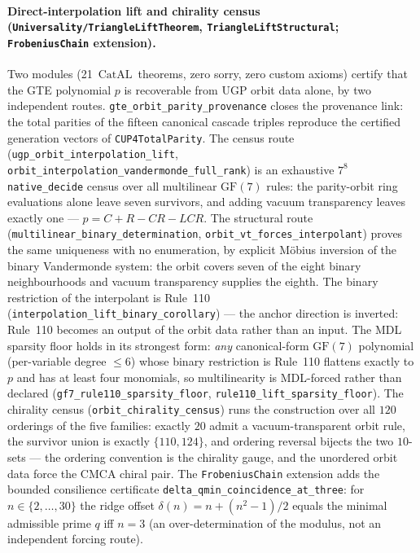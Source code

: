 \documentclass[11pt,a4paper]{article}
\theoremstyle{definition}
\newcommand{\CatAL}{\ensuremath{\mathrm{CatAL}}}
\begin{document}
\paragraph{Direct-interpolation lift and chirality census
  (\texttt{Universality/\allowbreak TriangleLiftTheorem},
   \texttt{TriangleLiftStructural};
   \texttt{FrobeniusChain} extension).}
Two modules (21~\CatAL\ theorems, zero sorry, zero custom axioms) certify
that the GTE polynomial $p$ is recoverable from UGP orbit data alone, by two
independent routes.
\texttt{gte\_orbit\_parity\_provenance} closes the provenance link: the
total parities of the fifteen canonical cascade triples reproduce the
certified generation vectors of \texttt{CUP4TotalParity}.
The census route
(\texttt{ugp\_orbit\_interpolation\_lift},
 \texttt{orbit\_interpolation\_vandermonde\_full\_rank}) is an exhaustive
$7^8$ \texttt{native\_decide} census over all multilinear $\mathrm{GF}(7)$
rules: the parity-orbit ring evaluations alone leave seven survivors, and
adding vacuum transparency leaves exactly one --- $p = C + R - CR - LCR$.
The structural route
(\texttt{multilinear\_binary\_determination},
 \texttt{orbit\_vt\_forces\_interpolant}) proves the same uniqueness with no
enumeration, by explicit M\"obius inversion of the binary Vandermonde
system: the orbit covers seven of the eight binary neighbourhoods and vacuum
transparency supplies the eighth.
The binary restriction of the interpolant is Rule~110
(\texttt{interpolation\_lift\_binary\_corollary}) --- the anchor direction
is inverted: Rule~110 becomes an output of the orbit data rather than an
input.
The MDL sparsity floor holds in its strongest form: \emph{any}
canonical-form $\mathrm{GF}(7)$ polynomial (per-variable degree $\le 6$)
whose binary restriction is Rule~110 flattens exactly to $p$ and has at
least four monomials, so multilinearity is MDL-forced rather than declared
(\texttt{gf7\_rule110\_sparsity\_floor},
 \texttt{rule110\_lift\_sparsity\_floor}).
The chirality census (\texttt{orbit\_chirality\_census}) runs the
construction over all $120$ orderings of the five families: exactly $20$
admit a vacuum-transparent orbit rule, the survivor union is exactly
$\{110, 124\}$, and ordering reversal bijects the two $10$-sets --- the
ordering convention is the chirality gauge, and the unordered orbit data
force the CMCA chiral pair.
The \texttt{FrobeniusChain} extension adds the bounded consilience
certificate \texttt{delta\_qmin\_coincidence\_at\_three}: for
$n \in \{2,\dots,30\}$ the ridge offset $\delta(n) = n + (n^2-1)/2$ equals
the minimal admissible prime $q$ iff $n = 3$ (an over-determination of the
modulus, not an independent forcing route).
\end{document}
